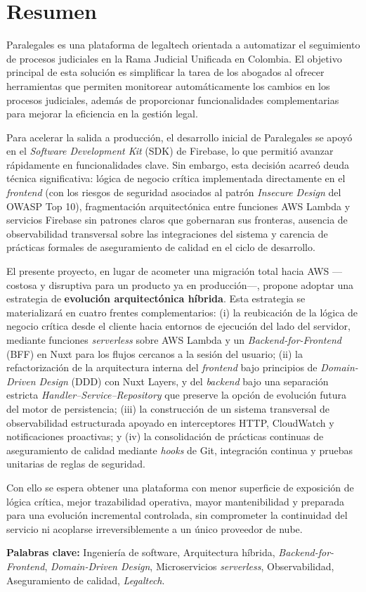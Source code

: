 \section*{Resumen}

Paralegales es una plataforma de legaltech orientada a automatizar el seguimiento de procesos judiciales en la Rama Judicial Unificada en Colombia. El objetivo principal de esta solución es simplificar la tarea de los abogados al ofrecer herramientas que permiten monitorear automáticamente los cambios en los procesos judiciales, además de proporcionar funcionalidades complementarias para mejorar la eficiencia en la gestión legal.

Para acelerar la salida a producción, el desarrollo inicial de Paralegales se apoyó en el \textit{Software Development Kit} (SDK) de Firebase, lo que permitió avanzar rápidamente en funcionalidades clave. Sin embargo, esta decisión acarreó deuda técnica significativa: lógica de negocio crítica implementada directamente en el \textit{frontend} (con los riesgos de seguridad asociados al patrón \textit{Insecure Design} del OWASP Top 10), fragmentación arquitectónica entre funciones AWS Lambda y servicios Firebase sin patrones claros que gobernaran sus fronteras, ausencia de observabilidad transversal sobre las integraciones del sistema y carencia de prácticas formales de aseguramiento de calidad en el ciclo de desarrollo.

El presente proyecto, en lugar de acometer una migración total hacia AWS —costosa y disruptiva para un producto ya en producción—, propone adoptar una estrategia de \textbf{evolución arquitectónica híbrida}. Esta estrategia se materializará en cuatro frentes complementarios: (i) la reubicación de la lógica de negocio crítica desde el cliente hacia entornos de ejecución del lado del servidor, mediante funciones \textit{serverless} sobre AWS Lambda y un \textit{Backend-for-Frontend} (BFF) en Nuxt para los flujos cercanos a la sesión del usuario; (ii) la refactorización de la arquitectura interna del \textit{frontend} bajo principios de \textit{Domain-Driven Design} (DDD) con Nuxt Layers, y del \textit{backend} bajo una separación estricta \textit{Handler--Service--Repository} que preserve la opción de evolución futura del motor de persistencia; (iii) la construcción de un sistema transversal de observabilidad estructurada apoyado en interceptores HTTP, CloudWatch y notificaciones proactivas; y (iv) la consolidación de prácticas continuas de aseguramiento de calidad mediante \textit{hooks} de Git, integración continua y pruebas unitarias de reglas de seguridad.

Con ello se espera obtener una plataforma con menor superficie de exposición de lógica crítica, mejor trazabilidad operativa, mayor mantenibilidad y preparada para una evolución incremental controlada, sin comprometer la continuidad del servicio ni acoplarse irreversiblemente a un único proveedor de nube.

\hfill

\textbf{Palabras clave:} Ingeniería de software, Arquitectura híbrida, \textit{Backend-for-Frontend}, \textit{Domain-Driven Design}, Microservicios \textit{serverless}, Observabilidad, Aseguramiento de calidad, \textit{Legaltech}.
